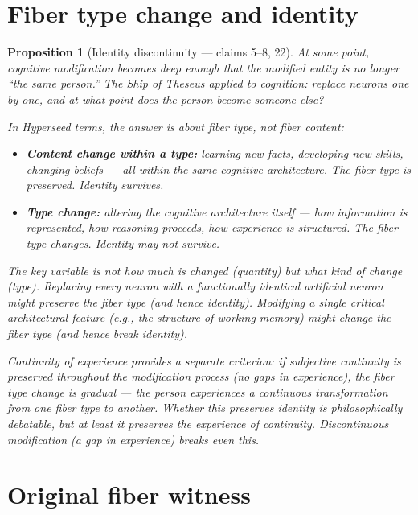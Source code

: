\documentclass[11pt,a4paper]{article}
\newtheorem{proposition}[definition]{Proposition}
\begin{document}
\section{Fiber type change and identity}
\label{sec:identity}

\begin{proposition}[Identity discontinuity --- claims 5--8, 22]
\label{prop:identity}
At some point, cognitive modification becomes deep enough that the
modified entity is no longer ``the same person.'' The Ship of Theseus
applied to cognition: replace neurons one by one, and at what point
does the person become someone else?

In Hyperseed terms, the answer is about \emph{fiber type}, not fiber
content:
\begin{itemize}
\item \textbf{Content change within a type:} learning new facts,
  developing new skills, changing beliefs --- all within the same
  cognitive architecture. The fiber type is preserved. Identity
  survives.
\item \textbf{Type change:} altering the cognitive architecture itself
  --- how information is represented, how reasoning proceeds, how
  experience is structured. The fiber type changes. Identity may
  not survive.
\end{itemize}

The key variable is not \emph{how much} is changed (quantity) but
\emph{what kind} of change (type). Replacing every neuron with a
functionally identical artificial neuron might preserve the fiber type
(and hence identity). Modifying a single critical architectural feature
(e.g., the structure of working memory) might change the fiber type
(and hence break identity).

Continuity of experience provides a separate criterion: if subjective
continuity is preserved throughout the modification process (no gaps
in experience), the fiber type change is \emph{gradual} --- the person
experiences a continuous transformation from one fiber type to another.
Whether this preserves identity is philosophically debatable, but at
least it preserves the \emph{experience} of continuity. Discontinuous
modification (a gap in experience) breaks even this.
\end{proposition}

\section{Original fiber witness}
\label{sec:witness}
\end{document}
